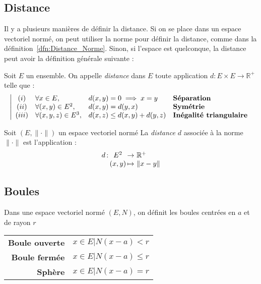 \documentclass[11pt,a4paper,fleqn,pdftex]{report}
\begin{document}
\subsection{Distance} %
\label{sub:distance}
Il y a plusieurs manières de définir la distance. Si on se place dans un espace vectoriel normé, on peut utiliser la norme pour définir la distance, comme dans la définition~\ref{dfn:Distance_Norme}. Sinon, si l'espace est quelconque, la distance peut avoir la définition générale suivante : 
\begin{dfn}
Soit $E$ un ensemble. On appelle \emph{distance} dans $E$ toute application $d : E\times E \to \mathbb{R}^+$ telle que :
     \begin{equation}
        \left| 
        \begin{array}{c l l l}
        (i)&\forall x \in E,& d(x,y)=0 \implies x=y &\textbf{Séparation}\\
        (ii)&\forall (x,y) \in E^2,& d(x,y) = d(y,x) &\textbf{Symétrie}\\
        (iii)&\forall (x,y,z) \in E^3,& d(x,z)\le d(x,y)+d(y,z)&\textbf{Inégalité triangulaire}\\
        \end{array}
        \right.
        \end{equation}
\end{dfn}
\begin{dfn}\label{dfn:Distance_Norme}
     Soit $(E,\| \cdot \|)$ un espace vectoriel normé\newline
     La \emph{distance} $d$ associée à la norme $\| \cdot \|$ est l'application :
     \begin{equation}
     \begin{array}{r @{\,}c@{\,} c @{\,}c@{\,} @{\,} l}
     d &: &E^2 &\to &\mathbb{R}^+ \\
        & &(x,y) &\mapsto & \| x - y \| 
        \end{array}
     \end{equation}
\end{dfn}
\subsection{Boules} %
\label{sub:boules}
\begin{dfn}[Boule]
Dans une espace vectoriel normé $(E,N)$, on définit les boules centrées en $a$ et de rayon $r$
    \begin{tabular}{>{\bfseries}r @{ de rayon $r$ centrée en $a$ : $\quad$ } l}
    Boule ouverte & ${x \in E | N(x-a)< r } $ \\
    Boule fermée & ${x \in E | N(x-a)\le r } $ \\
    Sphère & ${x \in E | N(x-a)= r } $ \\
    \end{tabular}
\end{dfn}
\end{document}
